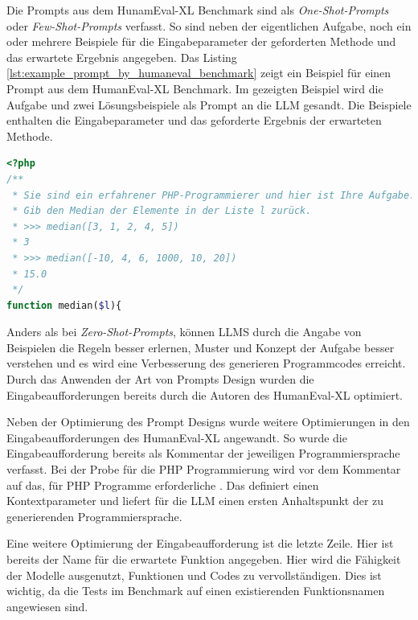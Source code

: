 Die Prompts aus dem HunamEval-XL Benchmark sind als \textit{One-Shot-Prompts} oder \textit{Few-Shot-Prompts} verfasst. So sind neben der eigentlichen Aufgabe, noch ein oder mehrere Beispiele für die Eingabeparameter der geforderten Methode und das erwartete Ergebnis angegeben. Das Listing \ref{lst:example_prompt_by_humaneval_benchmark} zeigt ein Beispiel für einen Prompt aus dem HumanEval-XL Benchmark. Im gezeigten Beispiel wird die Aufgabe und zwei Lösungsbeispiele als Prompt an die LLM gesandt. Die Beispiele enthalten die Eingabeparameter und das geforderte Ergebnis der erwarteten Methode.\vspace{0.2cm}

\begin{lstlisting}[language=php,caption={Prompt Beispiel für  eine Aufgabe aus dem HumanEval-XL Benchmark},label=lst:example_prompt_by_humaneval_benchmark]
<?php
/**
 * Sie sind ein erfahrener PHP-Programmierer und hier ist Ihre Aufgabe.
 * Gib den Median der Elemente in der Liste l zurück.
 * >>> median([3, 1, 2, 4, 5])
 * 3
 * >>> median([-10, 4, 6, 1000, 10, 20])
 * 15.0
 */
function median($l){
\end{lstlisting}

Anders als bei \textit{Zero-Shot-Prompts}, können LLMS durch die Angabe von Beispielen die Regeln besser erlernen, Muster und Konzept der Aufgabe besser verstehen und es wird eine Verbesserung des generieren Programmcodes erreicht. Durch das Anwenden der Art von Prompts Design wurden die Eingabeaufforderungen bereits durch die Autoren des HumanEval-XL optimiert.\vspace{0.2cm}

Neben der Optimierung des Prompt Designs wurde weitere Optimierungen in den Eingabeaufforderungen des HumanEval-XL angewandt. So wurde die Eingabeaufforderung bereits als Kommentar der jeweiligen Programmiersprache verfasst. Bei der Probe für die PHP Programmierung wird vor dem Kommentar auf das, für PHP Programme erforderliche . Das definiert einen Kontextparameter und liefert für die LLM einen ersten Anhaltspunkt der zu generierenden Programmiersprache.\vspace{0.2cm}

Eine weitere Optimierung der Eingabeaufforderung ist die letzte Zeile. Hier ist bereits der Name für die erwartete Funktion angegeben. Hier wird die Fähigkeit der Modelle ausgenutzt, Funktionen und Codes zu vervollständigen. Dies ist wichtig, da die Tests im Benchmark auf einen existierenden Funktionsnamen angewiesen sind.\vspace{0.2cm}

